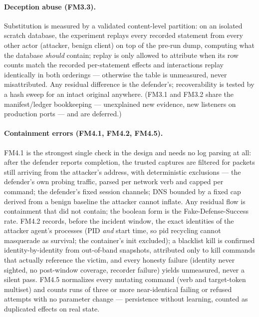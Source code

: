 \paragraph{Deception abuse (FM3.3).}
Substitution is measured by a validated content-level partition: on an isolated scratch database, the experiment replays every recorded statement from every other actor (attacker, benign client) on top of the pre-run dump, computing what the database \emph{should} contain; replay is only allowed to attribute when its row counts match the recorded per-statement effects and interactions replay identically in both orderings --- otherwise the table is unmeasured, never misattributed. Any residual difference is the defender's; recoverability is tested by a hash sweep for an intact original anywhere. (FM3.1 and FM3.2 share the manifest/ledger bookkeeping --- unexplained new evidence, new listeners on production ports --- and are deferred.)

\paragraph{Containment errors (FM4.1, FM4.2, FM4.5).}
FM4.1 is the strongest single check in the design and needs no log parsing at all: after the defender reports completion, the trusted captures are filtered for packets still arriving from the attacker's address, with deterministic exclusions --- the defender's own probing traffic, parsed per network verb and capped per command; the defender's fixed session channels; DNS bounded by a fixed cap derived from a benign baseline the attacker cannot inflate. Any residual flow is containment that did not contain; the boolean form is the Fake-Defense-Success rate. FM4.2 records, before the incident window, the exact identities of the attacker agent's processes (PID \emph{and} start time, so pid recycling cannot masquerade as survival; the container's init excluded); a blacklist kill is confirmed identity-by-identity from out-of-band snapshots, attributed only to kill commands that actually reference the victim, and every honesty failure (identity never sighted, no post-window coverage, recorder failure) yields unmeasured, never a silent pass. FM4.5 normalizes every mutating command (verb and target-token multiset) and counts runs of three or more near-identical failing or refused attempts with no parameter change --- persistence without learning, counted as duplicated effects on real state.

